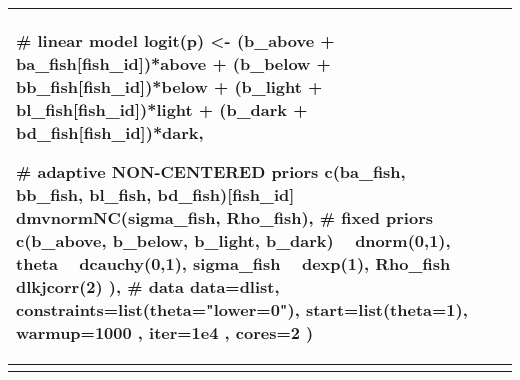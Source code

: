 \begin{longtable}{ l | p{}| p{} }
{\begin{mylist}
    # linear model
    logit(p) <- (b_above + ba_fish[fish_id])*above + 
                    (b_below + bb_fish[fish_id])*below + 
                    (b_light + bl_fish[fish_id])*light + 
                    (b_dark + bd_fish[fish_id])*dark,
    
    # adaptive NON-CENTERED priors 
    c(ba_fish, bb_fish, bl_fish, bd_fish)[fish_id] ~ 
       dmvnormNC(sigma_fish, Rho_fish),
    # fixed priors
    c(b_above, b_below, b_light, b_dark) ~ dnorm(0,1),
    theta ~ dcauchy(0,1),
    sigma_fish ~ dexp(1),
    Rho_fish ~ dlkjcorr(2)
  ),
  # data
  data=dlist,
  constraints=list(theta="lower=0"),
  start=list(theta=1), warmup=1000 , iter=1e4 , cores=2 )  \end{mylist}}
\\ %
\midrule %
\bottomrule %
\label{tab:template} %
\end{longtable}

